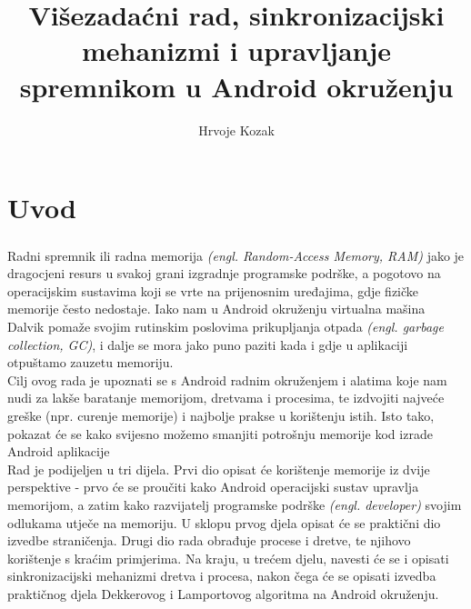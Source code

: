 \documentclass[times, utf8, zavrsni]{fer}
\begin{document}

\title{Višezadaćni rad, sinkronizacijski mehanizmi i upravljanje spremnikom u Android okruženju}

\author{Hrvoje Kozak}

\maketitle


\zahvala{}

\tableofcontents

\chapter{Uvod}
\paragraph{}
Radni spremnik ili radna memorija \textit{(engl. Random-Access Memory, RAM)} jako je dragocjeni resurs u svakoj grani izgradnje programske podrške, a pogotovo na operacijskim sustavima koji se vrte na prijenosnim uređajima, gdje fizičke memorije često nedostaje. Iako nam u Android okruženju virtualna mašina Dalvik pomaže svojim rutinskim poslovima prikupljanja otpada \textit{(engl. garbage collection, GC)}, i dalje se mora jako puno paziti kada i gdje u aplikaciji otpuštamo zauzetu memoriju.\\

Cilj ovog rada je upoznati se s Android radnim okruženjem i alatima koje nam nudi za lakše baratanje memorijom, dretvama i procesima, te izdvojiti najveće greške (npr. curenje memorije) i najbolje prakse u korištenju istih. Isto tako, pokazat će se kako svijesno možemo smanjiti potrošnju memorije kod izrade Android aplikacije\\

Rad je podijeljen u tri dijela. Prvi dio opisat će korištenje memorije iz dvije perspektive - prvo će se proučiti kako Android operacijski sustav upravlja memorijom, a zatim kako razvijatelj programske podrške \textit{(engl. developer)} svojim odlukama utječe na memoriju. U sklopu prvog djela opisat će se praktični dio izvedbe straničenja. Drugi dio rada obrađuje procese i dretve, te njihovo korištenje s kraćim primjerima. Na kraju, u trećem djelu, navesti će se i opisati sinkronizacijski mehanizmi dretva i procesa, nakon čega će se opisati izvedba praktičnog djela Dekkerovog i Lamportovog algoritma na Android okruženju.\\
\end{document}
